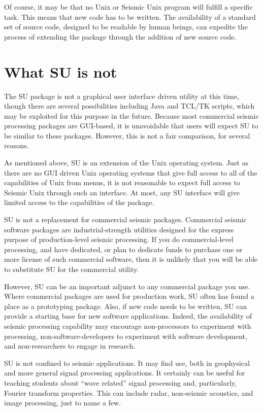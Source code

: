 Of course, it may be that no Unix or Seismic Unix program will fulfill
a specific task. 
This means that new code has to be written.
The availability of a standard set of source code, designed
to be readable by human beings, can expedite the process of extending
the package through the addition of new source code.

\section{What SU is not}

The SU package is not a graphical user interface driven utility
at this time, though there are several possibilities including Java
and TCL/TK scripts, which may be exploited for this purpose in the future.
Because most commercial seismic processing packages are GUI-based,
it is unavoidable that users will expect SU to be similar to these
packages.
However, this is not a fair comparison, for several reasons. 

As mentioned above, SU is an extension of the Unix operating system.
Just as there are no GUI driven Unix operating systems that give full
access to all of the capabilities of Unix from menus, it is not 
reasonable to expect full access to Seismic Unix through such an 
interface.   At most, any SU interface will give limited access
to the capabilities of the package.

SU is not a replacement for commercial seismic packages. Commercial
seismic software packages are industrial-strength utilities designed
for the express purpose of production-level seismic processing.
If you do commercial-level processing, and have dedicated, or plan
to dedicate funds to purchase one or more license of such commercial
software, then it is unlikely that you will be able to substitute
SU for the commercial utility.

However, SU can be an important adjunct to any commercial package
you use. Where commercial packages are used for 
production work, SU often has found a place as a prototyping package. 
Also, if new code needs to be written, SU can provide a starting base
for new software applications.
Indeed, the availability of seismic processing capability may encourage
non-processors to experiment with processing, non-software-developers
to experiment with software development, and non-researchers to 
engage in research.

SU is not confined to seismic applications. It may find use, both
in geophysical and more general signal processing applications. It certainly
can be useful for teaching students about ``wave related'' signal
processing and, particularly, Fourier transform properties.
This can include radar, non-seismic acoustics, and image processing,
just to name a few.

